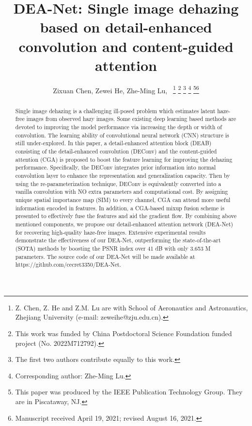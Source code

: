 \documentclass[lettersize,journal]{IEEEtran}
\begin{document}
\title{DEA-Net: Single image dehazing based on detail-enhanced convolution and content-guided attention}

\author{Zixuan Chen, Zewei He, Zhe-Ming Lu,~
\thanks{Z. Chen, Z. He and Z.M. Lu are with School of Aeronautics and Astronautics, Zhejiang University (e-mail: zeweihe@zju.edu.cn).}
	\thanks{This work was funded by China Postdoctoral Science Foundation funded project (No. 2022M712792).}
	\thanks{The first two authors contribute equally to this work.}
	\thanks{Corresponding author: Zhe-Ming Lu.}
	\thanks{This paper was produced by the IEEE Publication Technology Group. They are in Piscataway, NJ.}\thanks{Manuscript received April 19, 2021; revised August 16, 2021.}}






\maketitle

\newcommand{\etal}{et al.}
\newcommand{\eg}{e.g., }
\newcommand{\ie}{i.e., }

\begin{abstract}
Single image dehazing is a challenging ill-posed problem which estimates latent haze-free images from observed hazy images.
Some existing deep learning based methods are devoted to improving the model performance via increasing the depth or width of convolution.
The learning ability of convolutional neural network (CNN) structure is still under-explored.
In this paper, a detail-enhanced attention block (DEAB) consisting of the detail-enhanced convolution (DEConv) and the content-guided attention (CGA) is proposed to boost the feature learning for improving the dehazing performance.
Specifically, the DEConv integrates prior information into normal convolution layer to enhance the representation and generalization capacity. 
Then by using the re-parameterization technique, DEConv is equivalently converted into a vanilla convolution with NO extra parameters and computational cost.
By assigning unique spatial importance map (SIM) to every channel, CGA can attend more useful information encoded in features.
In addition, a CGA-based mixup fusion scheme is presented to effectively fuse the features and aid the gradient flow.
By combining above mentioned components, we propose our detail-enhanced attention network (DEA-Net) for recovering high-quality haze-free images.
Extensive experimental results demonstrate the effectiveness of our DEA-Net, outperforming the state-of-the-art (SOTA) methods by boosting the PSNR index over 41 dB with only 3.653 M parameters. The source code of our DEA-Net will be made available at https://github.com/cecret3350/DEA-Net.


\end{abstract}
\end{document}
